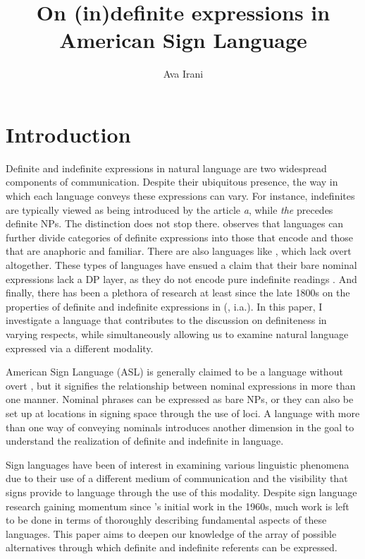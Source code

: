 \documentclass[output=paper,
modfonts
]{langscibook}
\title{On (in)definite expressions in American Sign Language}
\author{Ava Irani\affiliation{University of Pennsylvania}}
\begin{document}
\maketitle
\section{Introduction} 

Definite and indefinite expressions in natural language are two widespread components of communication. Despite their ubiquitous presence, the way in which each language conveys these expressions can vary. For instance,  indefinites are typically viewed as being introduced by the article \textit{a}, while \textit{the} precedes definite NPs. The distinction does not stop there. \citet{Schwarz2009} observes that languages can further divide categories of definite expressions into those that encode  and those that are anaphoric and familiar. There are also languages like , which lack overt  altogether. These types of languages have ensued a claim that their bare nominal expressions lack a DP layer, as they do not encode pure indefinite readings \citep{Dayal2004}. And finally, there has been a plethora of research at least since the late 1800s on the properties of definite and indefinite expressions in  (\citealt{Frege1892, Russell1905, Kamp1981, Heim1982}, i.a.). In this paper, I investigate a language that contributes to the discussion on definiteness in varying respects, while simultaneously allowing us to examine natural language expressed via a different modality. 

American Sign Language (ASL) is generally claimed to be a language without overt , but it signifies the relationship between nominal expressions in more than one manner. Nominal phrases can be expressed as bare NPs, or they can also be set up at locations in signing space through the use of loci. A language with more than one way of conveying nominals introduces another dimension in the goal to understand the realization of definite and indefinite  in language. 

Sign languages have been of interest in examining various linguistic phenomena due to their use of a different medium of communication and the visibility that signs provide to language through the use of this modality. Despite sign language research gaining momentum since \citeauthor{Stokoe1969}'s initial work in the 1960s, much work is left to be done in terms of thoroughly describing fundamental aspects of these languages. This paper aims to deepen our knowledge of the array of possible alternatives through which definite and indefinite referents can be expressed.
\end{document}
